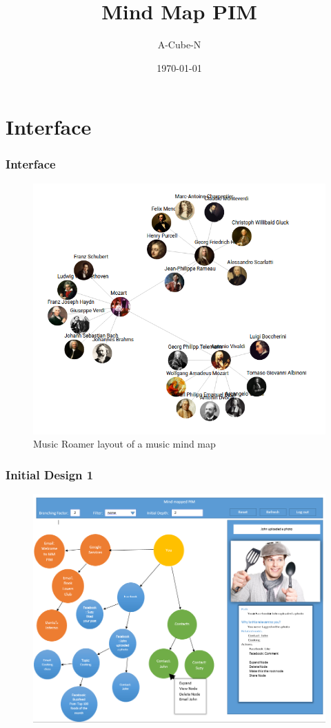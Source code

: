 \documentclass{beamer}
\title[Mind Map PIM]{Mind Map PIM}
\author{A-Cube-N}
\institute[UP]{
	Department of Computer Science, University of Pretoria
}
\date{\today}
\begin{document}
	\section{Interface}
		\begin{frame}
		\frametitle{Interface}
			\begin{figure}
				\includegraphics[scale=0.3]{musicroamer.png}
				\caption{Music Roamer layout of a music mind map}
			\end{figure}
		\end{frame}
		
		\begin{frame}
		\frametitle{Initial Design 1}
			\begin{figure}
				\includegraphics[scale=0.35]{initdesign.png}
			\end{figure}
		\end{frame}
		
\end{document}
